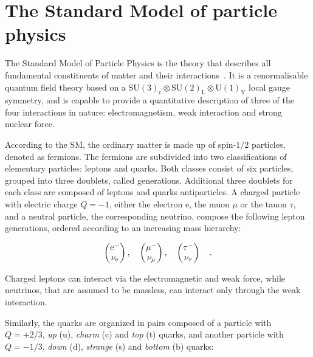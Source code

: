 \section{The Standard Model of particle physics}
\label{sec:SM}

The Standard Model of Particle Physics is the theory that describes all fundamental constituents of matter and their interactions~\cite{Halzen:1984mc}. It is a renormalisable quantum field theory based on a $\mathrm{SU(3)_c \otimes SU(2)_L \otimes U(1)_Y}$ local gauge symmetry, and is capable to provide a quantitative description of three of the four interactions in nature: electromagnetism, weak interaction and strong nuclear force. 

According to the SM, the ordinary matter is made up of spin-$1/2$ particles, denoted as fermions. The fermions are subdivided into two classifications of elementary particles: leptons and quarks. Both classes consist of six particles, grouped into three doublets, called generations. Additional three doublets for each class are composed of leptons and quarks antiparticles. A charged particle with electric charge $Q=-1$, either the electron e, the muon $\mu$ or the tauon $\tau$, and a neutral particle, the corresponding neutrino, compose the following lepton generations, ordered according to an increasing mass hierarchy:

\begin{equation}
\label{eq:leptons}
\begin{pmatrix} \rm e^-       \\ \nu_{\rm e}      \end{pmatrix}, \quad
\begin{pmatrix} \mu^-     \\ \nu_{\mu}  \end{pmatrix}, \quad
\begin{pmatrix} \tau^-    \\ \nu_{\tau} \end{pmatrix}  \quad .
\end{equation}

Charged leptons can interact via the electromagnetic and weak force, while neutrinos, that are assumed to be massless, can interact only through the weak interaction.

Similarly, the quarks are organized in pairs composed of a particle with $Q=+2/3$, \emph{up} (u), \emph{charm} (c) and \emph{top} (t) quarks, and another particle with $Q=-1/3$, \emph{down} (d), \emph{strange} (s) and \emph{bottom} (b) quarks:

